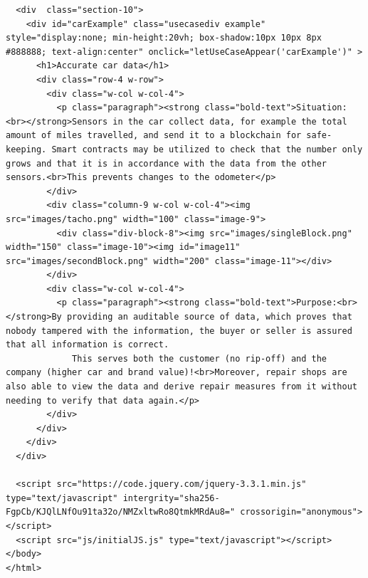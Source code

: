 \begin{lstlisting}
  <div  class="section-10">
    <div id="carExample" class="usecasediv example" style="display:none; min-height:20vh; box-shadow:10px 10px 8px #888888; text-align:center" onclick="letUseCaseAppear('carExample')" >
      <h1>Accurate car data</h1>
      <div class="row-4 w-row">
        <div class="w-col w-col-4">
          <p class="paragraph"><strong class="bold-text">Situation:<br></strong>Sensors in the car collect data, for example the total amount of miles travelled, and send it to a blockchain for safe-keeping. Smart contracts may be utilized to check that the number only grows and that it is in accordance with the data from the other sensors.<br>This prevents changes to the odometer</p>
        </div>
        <div class="column-9 w-col w-col-4"><img src="images/tacho.png" width="100" class="image-9">
          <div class="div-block-8"><img src="images/singleBlock.png" width="150" class="image-10"><img id="image11" src="images/secondBlock.png" width="200" class="image-11"></div>
        </div>
        <div class="w-col w-col-4">
          <p class="paragraph"><strong class="bold-text">Purpose:<br></strong>By providing an auditable source of data, which proves that nobody tampered with the information, the buyer or seller is assured that all information is correct.
             This serves both the customer (no rip-off) and the company (higher car and brand value)!<br>Moreover, repair shops are also able to view the data and derive repair measures from it without needing to verify that data again.</p>
        </div>
      </div>
    </div>
  </div>

  <script src="https://code.jquery.com/jquery-3.3.1.min.js" type="text/javascript" intergrity="sha256-FgpCb/KJQlLNfOu91ta32o/NMZxltwRo8QtmkMRdAu8=" crossorigin="anonymous"></script>
  <script src="js/initialJS.js" type="text/javascript"></script>
</body>
</html>

\end{lstlisting}

